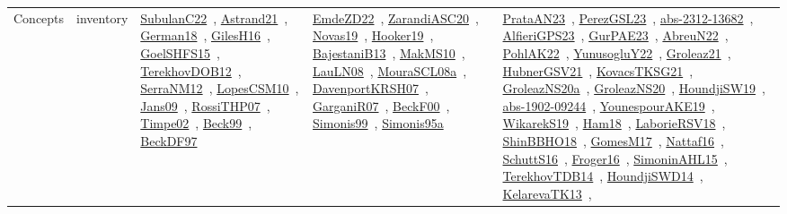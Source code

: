 {\begin{longtable}{lp{3cm}>{\raggedright\arraybackslash}p{6cm}>{\raggedright\arraybackslash}p{6cm}>{\raggedright\arraybackslash}p{8cm}}
Concepts & inventory & \href{works/SubulanC22.pdf}{SubulanC22}~\cite{SubulanC22}, \href{works/Astrand21.pdf}{Astrand21}~\cite{Astrand21}, \href{works/German18.pdf}{German18}~\cite{German18}, \href{works/GilesH16.pdf}{GilesH16}~\cite{GilesH16}, \href{works/GoelSHFS15.pdf}{GoelSHFS15}~\cite{GoelSHFS15}, \href{works/TerekhovDOB12.pdf}{TerekhovDOB12}~\cite{TerekhovDOB12}, \href{works/SerraNM12.pdf}{SerraNM12}~\cite{SerraNM12}, \href{works/LopesCSM10.pdf}{LopesCSM10}~\cite{LopesCSM10}, \href{works/Jans09.pdf}{Jans09}~\cite{Jans09}, \href{works/RossiTHP07.pdf}{RossiTHP07}~\cite{RossiTHP07}, \href{works/Timpe02.pdf}{Timpe02}~\cite{Timpe02}, \href{works/Beck99.pdf}{Beck99}~\cite{Beck99}, \href{works/BeckDF97.pdf}{BeckDF97}~\cite{BeckDF97} & \href{works/EmdeZD22.pdf}{EmdeZD22}~\cite{EmdeZD22}, \href{works/ZarandiASC20.pdf}{ZarandiASC20}~\cite{ZarandiASC20}, \href{works/Novas19.pdf}{Novas19}~\cite{Novas19}, \href{works/Hooker19.pdf}{Hooker19}~\cite{Hooker19}, \href{works/BajestaniB13.pdf}{BajestaniB13}~\cite{BajestaniB13}, \href{works/MakMS10.pdf}{MakMS10}~\cite{MakMS10}, \href{works/LauLN08.pdf}{LauLN08}~\cite{LauLN08}, \href{works/MouraSCL08a.pdf}{MouraSCL08a}~\cite{MouraSCL08a}, \href{works/DavenportKRSH07.pdf}{DavenportKRSH07}~\cite{DavenportKRSH07}, \href{works/GarganiR07.pdf}{GarganiR07}~\cite{GarganiR07}, \href{works/BeckF00.pdf}{BeckF00}~\cite{BeckF00}, \href{works/Simonis99.pdf}{Simonis99}~\cite{Simonis99}, \href{works/Simonis95a.pdf}{Simonis95a}~\cite{Simonis95a} & \href{works/PrataAN23.pdf}{PrataAN23}~\cite{PrataAN23}, \href{works/PerezGSL23.pdf}{PerezGSL23}~\cite{PerezGSL23}, \href{works/abs-2312-13682.pdf}{abs-2312-13682}~\cite{abs-2312-13682}, \href{works/AlfieriGPS23.pdf}{AlfieriGPS23}~\cite{AlfieriGPS23}, \href{works/GurPAE23.pdf}{GurPAE23}~\cite{GurPAE23}, \href{works/AbreuN22.pdf}{AbreuN22}~\cite{AbreuN22}, \href{works/PohlAK22.pdf}{PohlAK22}~\cite{PohlAK22}, \href{works/YunusogluY22.pdf}{YunusogluY22}~\cite{YunusogluY22}, \href{works/Groleaz21.pdf}{Groleaz21}~\cite{Groleaz21}, \href{works/HubnerGSV21.pdf}{HubnerGSV21}~\cite{HubnerGSV21}, \href{works/KovacsTKSG21.pdf}{KovacsTKSG21}~\cite{KovacsTKSG21}, \href{works/GroleazNS20a.pdf}{GroleazNS20a}~\cite{GroleazNS20a}, \href{works/GroleazNS20.pdf}{GroleazNS20}~\cite{GroleazNS20}, \href{works/HoundjiSW19.pdf}{HoundjiSW19}~\cite{HoundjiSW19}, \href{works/abs-1902-09244.pdf}{abs-1902-09244}~\cite{abs-1902-09244}, \href{works/YounespourAKE19.pdf}{YounespourAKE19}~\cite{YounespourAKE19}, \href{works/WikarekS19.pdf}{WikarekS19}~\cite{WikarekS19}, \href{works/Ham18.pdf}{Ham18}~\cite{Ham18}, \href{works/LaborieRSV18.pdf}{LaborieRSV18}~\cite{LaborieRSV18}, \href{works/ShinBBHO18.pdf}{ShinBBHO18}~\cite{ShinBBHO18}, \href{works/GomesM17.pdf}{GomesM17}~\cite{GomesM17}, \href{works/Nattaf16.pdf}{Nattaf16}~\cite{Nattaf16}, \href{works/SchuttS16.pdf}{SchuttS16}~\cite{SchuttS16}, \href{works/Froger16.pdf}{Froger16}~\cite{Froger16}, \href{works/SimoninAHL15.pdf}{SimoninAHL15}~\cite{SimoninAHL15}, \href{works/TerekhovTDB14.pdf}{TerekhovTDB14}~\cite{TerekhovTDB14}, \href{works/HoundjiSWD14.pdf}{HoundjiSWD14}~\cite{HoundjiSWD14}, \href{works/KelarevaTK13.pdf}{KelarevaTK13}~\cite{KelarevaTK13}, 
\end{longtable}}
